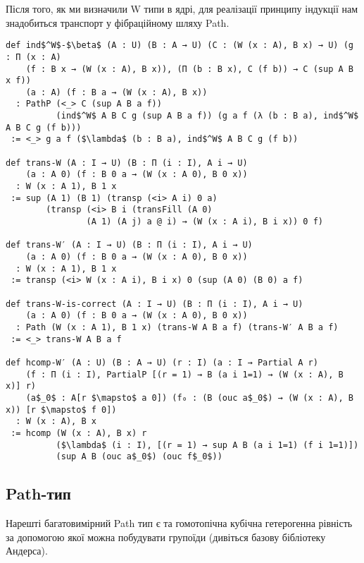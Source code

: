\newpage
Після того, як ми визначили W типи в ядрі, для реалізації
принципу індукції нам знадобиться транспорт у фібраційному шляху Path.

\begin{lstlisting}
def ind$^W$-$\beta$ (A : U) (B : A → U) (C : (W (x : A), B x) → U) (g : Π (x : A)
    (f : B x → (W (x : A), B x)), (Π (b : B x), C (f b)) → C (sup A B x f))
    (a : A) (f : B a → (W (x : A), B x))
  : PathP (<_> C (sup A B a f))
          (ind$^W$ A B C g (sup A B a f)) (g a f (λ (b : B a), ind$^W$ A B C g (f b)))
 := <_> g a f ($\lambda$ (b : B a), ind$^W$ A B C g (f b))

def trans-W (A : I → U) (B : Π (i : I), A i → U)
    (a : A 0) (f : B 0 a → (W (x : A 0), B 0 x))
  : W (x : A 1), B 1 x
 := sup (A 1) (B 1) (transp (<i> A i) 0 a)
        (transp (<i> B i (transFill (A 0)
                (A 1) (A j) a @ i) → (W (x : A i), B i x)) 0 f)

def trans-W′ (A : I → U) (B : Π (i : I), A i → U)
    (a : A 0) (f : B 0 a → (W (x : A 0), B 0 x))
  : W (x : A 1), B 1 x
 := transp (<i> W (x : A i), B i x) 0 (sup (A 0) (B 0) a f)

def trans-W-is-correct (A : I → U) (B : Π (i : I), A i → U)
    (a : A 0) (f : B 0 a → (W (x : A 0), B 0 x))
  : Path (W (x : A 1), B 1 x) (trans-W A B a f) (trans-W′ A B a f)
 := <_> trans-W A B a f

def hcomp-W′ (A : U) (B : A → U) (r : I) (a : I → Partial A r)
    (f : Π (i : I), PartialP [(r = 1) → B (a i 1=1) → (W (x : A), B x)] r)
    (a$_0$ : A[r $\mapsto$ a 0]) (f₀ : (B (ouc a$_0$) → (W (x : A), B x)) [r $\mapsto$ f 0])
  : W (x : A), B x
 := hcomp (W (x : A), B x) r
          ($\lambda$ (i : I), [(r = 1) → sup A B (a i 1=1) (f i 1=1)])
          (sup A B (ouc a$_0$) (ouc f$_0$))
\end{lstlisting}

\newpage
\subsection*{Path-тип}
Нарешті багатовимірний Path тип є та гомотопічна кубічна гетерогенна
рівність за допомогою якої можна побудувати групоїди (дивіться базову бібліотеку Андерса).

